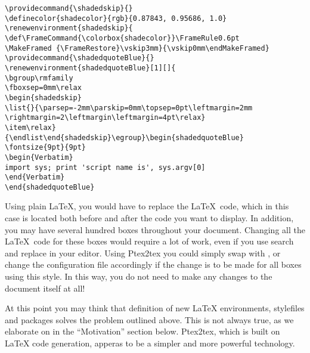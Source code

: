 \documentclass[a4paper,11pt]{article}
\begin{document}
\begin{verbatim}
\providecommand{\shadedskip}{}
\definecolor{shadecolor}{rgb}{0.87843, 0.95686, 1.0}
\renewenvironment{shadedskip}{
\def\FrameCommand{\colorbox{shadecolor}}\FrameRule0.6pt
\MakeFramed {\FrameRestore}\vskip3mm}{\vskip0mm\endMakeFramed}
\providecommand{\shadedquoteBlue}{}
\renewenvironment{shadedquoteBlue}[1][]{
\bgroup\rmfamily
\fboxsep=0mm\relax
\begin{shadedskip}
\list{}{\parsep=-2mm\parskip=0mm\topsep=0pt\leftmargin=2mm
\rightmargin=2\leftmargin\leftmargin=4pt\relax}
\item\relax}
{\endlist\end{shadedskip}\egroup}\begin{shadedquoteBlue}
\fontsize{9pt}{9pt}
\begin{Verbatim}
import sys; print 'script name is', sys.argv[0]
\end{Verbatim}
\end{shadedquoteBlue}
\end{verbatim}
\noindent
Using plain \LaTeX, you would have to replace the \LaTeX~code, which in this
case is located both before and after the code you want to display. In
addition, you may have several hundred boxes throughout your document. Changing
all the \LaTeX~code for these boxes would require a lot of work, even if you
use search and replace in your editor. Using Ptex2tex you could
simply swap  with , or change the configuration file
accordingly if the change is to be made for all boxes using this style.
In this way, you do not need to
make any changes to the document itself at all!

At this point you may think that definition of new
\LaTeX{} environments, stylefiles and packages solves the problem
outlined above. This is not always true, as we elaborate on in the
``Motivation'' section below. Ptex2tex, which is built on
\LaTeX{} code generation, apperas to be a simpler
and more powerful technology.
\end{document}
